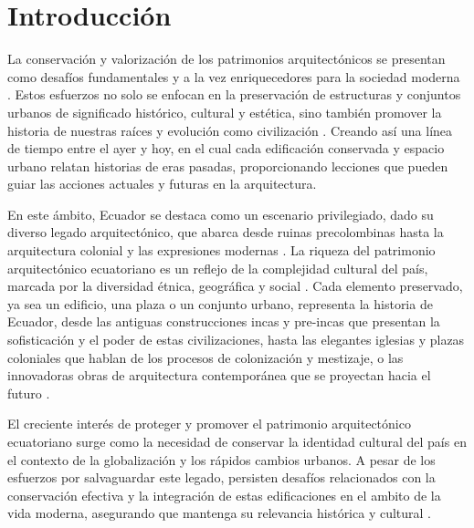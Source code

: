\documentclass[journal,article,submit,pdftex,moreauthors]{Definitions/mdpi}
\begin{document}


\section{Introducción}

La conservación y valorización de los patrimonios arquitectónicos se presentan como desafíos fundamentales y a la vez enriquecedores para la sociedad moderna \cite{art:articulo1}. Estos esfuerzos no solo se enfocan en la preservación de estructuras y conjuntos urbanos de significado histórico, cultural y estética, sino también promover la historia de nuestras raíces y evolución como civilización \cite{art:articulo2}. Creando así una línea de tiempo entre el ayer y hoy, en el cual cada edificación conservada y espacio urbano relatan historias de eras pasadas, proporcionando lecciones que pueden guiar las acciones actuales y futuras en la arquitectura\cite{art:articulo3}.

En este ámbito, Ecuador se destaca como un escenario privilegiado, dado su diverso legado arquitectónico, que abarca desde ruinas precolombinas hasta la arquitectura colonial y las expresiones modernas \cite{art:articulo4}.  La riqueza del patrimonio arquitectónico ecuatoriano es un reflejo de la complejidad cultural del país, marcada por la diversidad étnica, geográfica y social \cite{art:articulo5}. Cada elemento preservado, ya sea un edificio, una plaza o un conjunto urbano, representa la historia de Ecuador, desde las antiguas construcciones incas y pre-incas que presentan la sofisticación y el poder de estas civilizaciones, hasta las elegantes iglesias y plazas coloniales que hablan de los procesos de colonización y mestizaje, o las innovadoras obras de arquitectura contemporánea que se proyectan hacia el futuro \cite{art:articulo6}.

El creciente interés de proteger y promover el patrimonio arquitectónico ecuatoriano surge como  la necesidad de conservar la identidad cultural del país en el contexto de la globalización y los rápidos cambios urbanos. A pesar de los  esfuerzos por salvaguardar este legado, persisten desafíos relacionados con la conservación efectiva y la integración de estas edificaciones en el ambito de la vida moderna, asegurando que mantenga su relevancia histórica y cultural \cite{art:articulo7}.
\end{document}
